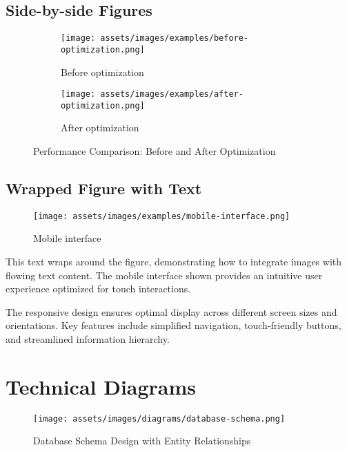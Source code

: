 \documentclass{internshipreport}
\begin{document}
\subsection{Side-by-side Figures}

\begin{figure}[H]
\centering
\begin{subfigure}[b]{0.45\textwidth}
\texttt{[image: assets/images/examples/before-optimization.png]}
\caption{Before optimization}
\label{fig:before}
\end{subfigure}
\hfill
\begin{subfigure}[b]{0.45\textwidth}
\texttt{[image: assets/images/examples/after-optimization.png]}
\caption{After optimization}
\label{fig:after}
\end{subfigure}
\caption{Performance Comparison: Before and After Optimization}
\label{fig:comparison}
\end{figure}

\subsection{Wrapped Figure with Text}

\begin{wrapfigure}{r}{0.4\textwidth}
\centering
\texttt{[image: assets/images/examples/mobile-interface.png]}
\caption{Mobile interface}
\label{fig:mobile}
\end{wrapfigure}

This text wraps around the figure, demonstrating how to integrate images with flowing text content. The mobile interface shown provides an intuitive user experience optimized for touch interactions.

The responsive design ensures optimal display across different screen sizes and orientations. Key features include simplified navigation, touch-friendly buttons, and streamlined information hierarchy.

\section{Technical Diagrams}

\begin{figure}[H]
\centering
\texttt{[image: assets/images/diagrams/database-schema.png]}
\caption{Database Schema Design with Entity Relationships}
\label{fig:database-schema}
\end{figure}
\end{document}
